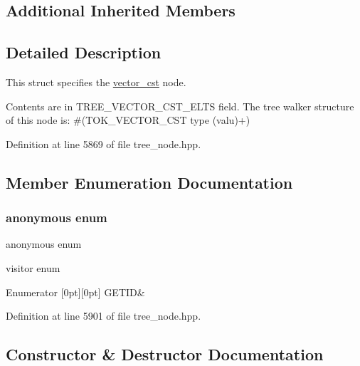 \subsection*{Additional Inherited Members}


\subsection{Detailed Description}
This struct specifies the \hyperlink{structvector__cst}{vector\+\_\+cst} node. 

Contents are in T\+R\+E\+E\+\_\+\+V\+E\+C\+T\+O\+R\+\_\+\+C\+S\+T\+\_\+\+E\+L\+TS field. The tree walker structure of this node is\+: \#(T\+O\+K\+\_\+\+V\+E\+C\+T\+O\+R\+\_\+\+C\+ST type (valu)+) 

Definition at line 5869 of file tree\+\_\+node.\+hpp.



\subsection{Member Enumeration Documentation}
\mbox{\label{structvector__cst_a3357a1249410327c21c68ab421cc4b63}} 
\subsubsection{\texorpdfstring{anonymous enum}{anonymous enum}}
{\footnotesize\ttfamily anonymous enum}



visitor enum 

\begin{DoxyEnumFields}{Enumerator}
[0pt][0pt]{}\mbox{\label{structvector__cst_a3357a1249410327c21c68ab421cc4b63ad2feab60e6a7fb750d3465cd7f87ec80}} 
G\+E\+T\+ID&\\
\hline

\end{DoxyEnumFields}


Definition at line 5901 of file tree\+\_\+node.\+hpp.



\subsection{Constructor \& Destructor Documentation}
\mbox{\label{structvector__cst_a001207e99c4e6c19540a96a733a362b4}} 
